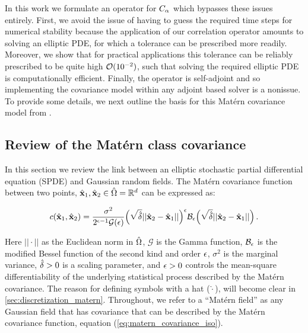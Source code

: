 In this work we formulate an operator for $C_\alpha$ which bypasses these
issues entirely.
First, we avoid the issue of having to guess the required time steps for numerical
stability because the application of our correlation operator amounts to solving an
elliptic PDE, for which a tolerance can be prescribed more readily.
Moreover, we show that for practical applications this tolerance can be reliably
prescribed to be quite high $\mathcal{O}(10^{-2})$, such that solving the required
elliptic PDE is computationally efficient.
Finally, the operator is self-adjoint and so implementing the covariance model
within any adjoint based solver is a nonissue.
To provide some details, we next outline the basis for this Mat\'ern covariance
model from \citet{RSSB:RSSB777}.


\subsection{Review of the Mat\'ern class covariance}
\label{ssec:matern_review}

In this section we review the link between an elliptic stochastic partial
differential equation (SPDE) and Gaussian random fields.
The Mat\'ern covariance function between two points, $\hat{\mathbf{x}}_1,\hat{\mathbf{x}}_2\in\hat{\Omega} =
\mathbb{R}^{d}$ can be expressed as:
\begin{linenomath*}\begin{equation}
    c(\hat{\mathbf{x}}_1,\hat{\mathbf{x}}_2) = \dfrac{\sigma^2}{2^{\epsilon-1}
    \mathcal{G}(\epsilon)}
    \Big(\sqrt{\hat{\delta}} ||\hat{\mathbf{x}}_2-\hat{\mathbf{x}}_1||\Big)^{\epsilon}
    \mathcal{B}_{\epsilon}
    \Big(\sqrt{\hat{\delta}} ||\hat{\mathbf{x}}_2-\hat{\mathbf{x}}_1||\Big) \, .
    \label{eq:matern_covariance_iso}
\end{equation}\end{linenomath*}
Here $||\cdot||$ as the Euclidean norm in $\hat{\Omega}$,
$\mathcal{G}$ is the Gamma function,
$\mathcal{B}_{\epsilon}$ is the modified
Bessel function of the second kind and order $\epsilon$,
$\sigma^2$ is the
marginal variance, $\hat{\delta}>0$ is a scaling parameter, and $\epsilon>0$
controls the mean-square differentiability of the underlying statistical process
described by the Mat\'ern covariance.
The reason for defining symbols with a hat ($\hat{\cdot}$), will become clear
in \cref{sec:discretization_matern}.
Throughout, we refer to a ``Mat\'ern field'' as any Gaussian field that has
covariance that can be described by the Mat\'ern covariance function,
equation (\ref{eq:matern_covariance_iso}).

